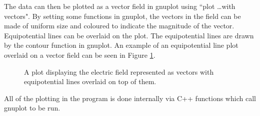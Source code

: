 The data can then be plotted as a vector field in gnuplot using ``plot \ldots with vectors". By setting some functions in gnuplot, the vectors in the field can be made of uniform size and coloured to indicate the magnitude of the vector. Equipotential lines can be overlaid on the plot. The equipotential lines are drawn by the contour function in gnuplot. An example of an equipotential line plot overlaid on a vector field can be seen in Figure
\ref{fig:vectors_and_contours}.
\begin{figure}[h!]
\centering
\setlength\fboxsep{0pt}
\setlength\fboxrule{0.5pt}
\caption{A plot displaying the electric field represented as vectors with equipotential lines overlaid on top of them.}
\label{fig:vectors_and_contours}
\end{figure}
All of the plotting in the program is done internally via C++ functions which call gnuplot to be run.
